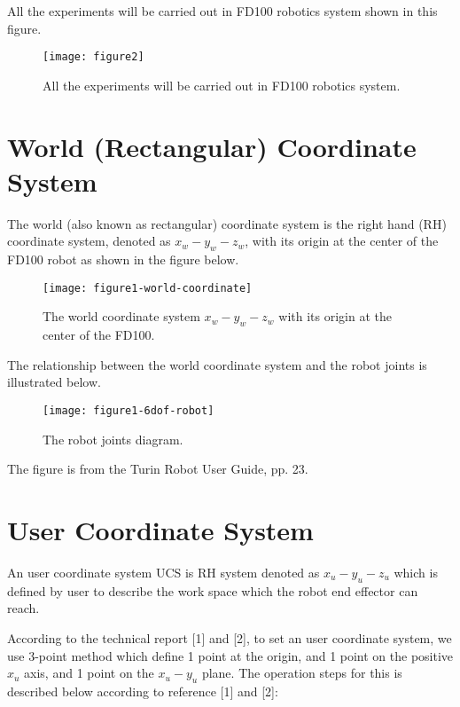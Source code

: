 \documentclass[conference]{IEEEtran}
\begin{document}
All the experiments will be carried out in FD100
robotics system shown in this figure. 
\begin{figure}[H] 
\centering
\texttt{[image: figure2]}  
\caption{All the experiments will be carried out in FD100
robotics system.}
\label{figure2} 
\end{figure}

\section{World (Rectangular) Coordinate System}
The world (also known as rectangular) 
coordinate system is the right hand (RH)
coordinate system, denoted as $x_w-y_w-z_w$, with its 
origin at the center of the FD100 robot as shown in 
the figure below. 
\begin{figure}[H] 
\centering
\texttt{[image: figure1-world-coordinate]}  
\caption{The world coordinate system $x_w-y_w-z_w$ with its 
origin at the center of the FD100.}
\label{figure1-world-coordinate} 
\end{figure} 
The relationship between the world coordinate system 
and the robot joints is illustrated below. 
\begin{figure}[H] 
\centering
\texttt{[image: figure1-6dof-robot]} %
\caption{The robot joints diagram.}
\label{figure1-6dof-robot} 
\end{figure}
The figure is from the Turin Robot User Guide, pp. 23.  


\section{User Coordinate System}
An user coordinate system UCS is RH system denoted 
as $x_u-y_u-z_u$ which is defined
by user to describe the work space which the robot
end effector can reach. 

According to the technical report [1] and [2], to set an 
user coordinate system, we use 3-point method which 
define 1 point at the origin, and 1 point on the positive $x_u$
axis, and 1 point on the $x_u-y_u$ plane. The operation
steps for this is described below according to reference
[1] and [2]: 
 
\end{document}
